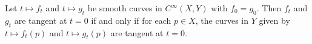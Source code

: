 Let $t \mapsto f_t$ and $t \mapsto g_t$ be smooth curves in $C^\infty(X, Y)$ with $f_0 = g_0$. Then $f_t$ and $g_t$ are tangent at $t = 0$ if and only if for each $p \in X$, the curves in $Y$ given by $t \mapsto f_t(p)$ and $t \mapsto g_t(p)$ are tangent at $t = 0$.
